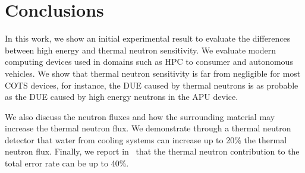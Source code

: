 \section{Conclusions}
\label{sec_conclusion}

In this work, we show an initial experimental result to evaluate the differences between high energy and thermal neutron sensitivity. We evaluate modern computing devices used in domains such as HPC to consumer and autonomous vehicles. We show that thermal neutron sensitivity is far from negligible for most COTS devices, for instance, the DUE caused by thermal neutrons is as probable as the DUE caused by high energy neutrons
in the APU device.

We also discuss the neutron fluxes and how the surrounding material may increase the thermal neutron flux. We demonstrate through a thermal neutron detector that water from cooling systems can increase up to 20\% the thermal neutron flux. Finally, we report in~\cite{jsc2020} that the thermal neutron contribution to the total error rate can be up to 40\%.


%
